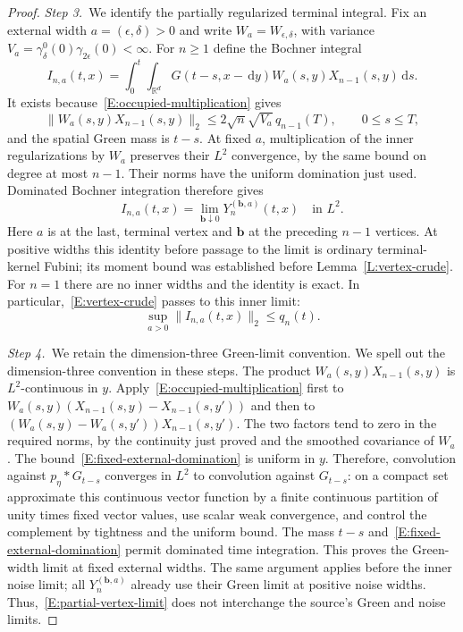 \documentclass[12pt,oneside,openany]{book}
\numberwithin{equation}{section}
\theoremstyle{nogostyle}
\theoremstyle{definition}
\newcommand{\R}{\mathbb{R}}
\newcommand{\ud}{\,\mathrm{d}}
\begin{document}
\begin{proof}
  \medskip
  \noindent\textit{Step 3.~}We identify the partially regularized terminal
  integral.
  Fix an external width $a = (\epsilon,\delta) > 0$ and write $W_a =
  W_{\epsilon,\delta}$, with variance $V_a =
  \gamma^0_\delta(0)\gamma_{2\epsilon}(0) < \infty$. For $n \ge 1$ define the
  Bochner integral
  \[
    I_{n,a}(t,x)=\int_0^t\int_{\R^d}G(t-s,x-\ud y)
    W_a(s,y)X_{n-1}(s,y)\ud s.
  \]
  It exists because~\eqref{E:occupied-multiplication} gives
  \begin{equation}\label{E:fixed-external-domination}
    \|W_a(s,y)X_{n-1}(s,y)\|_2
    \le2\sqrt n\sqrt{V_a}\,q_{n-1}(T),\qquad0\le s\le T,
  \end{equation}
  and the spatial Green mass is $t-s$. At fixed $a$, multiplication of the inner
  regularizations by $W_a$ preserves their $L^2$ convergence, by the same bound
  on degree at most $n-1$. Their norms have the uniform domination just used.
  Dominated Bochner integration therefore gives
  \begin{equation}\label{E:partial-vertex-limit}
    I_{n,a}(t,x)=\lim_{\boldsymbol b\downarrow0}
    Y_n^{(\boldsymbol b,a)}(t,x)\quad\text{in }L^2.
  \end{equation}
  Here $a$ is at the last, terminal vertex and $\boldsymbol b$ at the preceding
  $n-1$ vertices. At positive widths this identity before passage to the limit
  is ordinary terminal-kernel Fubini; its moment bound was established before
  Lemma~\ref{L:vertex-crude}. For $n = 1$ there are no inner widths and the
  identity is exact. In particular,~\eqref{E:vertex-crude} passes to this inner
  limit:
  \begin{equation}\label{E:mixed-vertex-bound}
    \sup_{a>0}\|I_{n,a}(t,x)\|_2\le q_n(t).
  \end{equation}


  \medskip
  \noindent\textit{Step 4.~}We retain the dimension-three Green-limit
  convention.
  We spell out the dimension-three convention in these steps. The product
  $W_a(s,y)X_{n-1}(s,y)$ is $L^2$-continuous in $y$.
  Apply~\eqref{E:occupied-multiplication} first to
  $W_a(s,y)(X_{n-1}(s,y)-X_{n-1}(s,y'))$ and then to
  $(W_a(s,y)-W_a(s,y'))X_{n-1}(s,y')$. The two factors tend to zero in the
  required norms, by the continuity just proved and the smoothed covariance of
  $W_a$. The bound~\eqref{E:fixed-external-domination} is uniform in $y$.
  Therefore, convolution against $p_\eta*G_{t-s}$ converges in $L^2$ to
  convolution against $G_{t-s}$: on a compact set approximate this continuous
  vector function by a finite continuous partition of unity times fixed vector
  values, use scalar weak convergence, and control the complement by tightness
  and the uniform bound. The mass $t-s$ and~\eqref{E:fixed-external-domination}
  permit dominated time integration. This proves the Green-width limit at fixed
  external widths. The same argument applies before the inner noise limit; all
  $Y_n^{(\boldsymbol b,a)}$ already use their Green limit at positive noise
  widths. Thus,~\eqref{E:partial-vertex-limit} does not interchange the source's
  Green and noise limits.



\end{proof}
\end{document}
